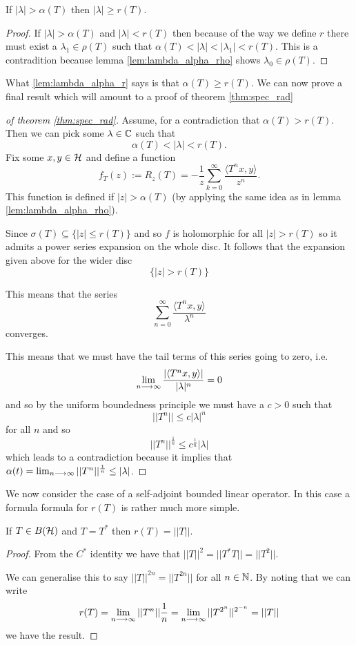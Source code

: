 \documentclass{unswmaths}
\begin{document}
\begin{lemma}
	\label{lem:lambda_alpha_r}
	If $ |\lambda| > \alpha(T) $ then $ |\lambda| \geq r(T) $.
\end{lemma}
\begin{proof}
	If $ |\lambda| > \alpha(T) $ and $ |\lambda| < r(T) $ then because of the way we define $ r $ there must exist a $ \lambda_1 \in \rho(T) $ such that
	$ \alpha(T) < |\lambda| < |\lambda_1| < r(T) $. This is a contradition because lemma \ref{lem:lambda_alpha_rho} shows
	$ \lambda_0 \in \rho(T) $.
\end{proof}

What \ref{lem:lambda_alpha_r} says is that $ \alpha(T) \geq r(T) $.
We can now prove a final result which will amount to a proof of theorem \ref{thm:spec_rad}

\begin{proof}[of theorem \ref{thm:spec_rad}]
Assume, for a contradiction that $ \alpha(T) > r(T) $. Then we can pick some $ \lambda \in \mathbb{C} $ such that 
$$
	\alpha(T) < |\lambda| < r(T).
$$
Fix some $ x, y \in \mathcal{H} $ and define a function
$$
	f_T(z) := R_z(T) = -\frac{1}{z} \sum_{k=0}^\infty \frac{\langle T^n x, y \rangle}{z^n}.
$$
This function is defined if $ |z| > \alpha(T) $ (by applying the same idea as in lemma \ref{lem:lambda_alpha_rho}).

Since $ \sigma(T) \subseteq \{ |z| \leq r(T) \} $ and so $ f $ is holomorphic for all $ |z| > r(T) $ so
it admits a power series expansion on the whole disc. It follows that the expansion given above for the wider disc
$$ \{ |z| > r(T) \} $$

This means that the series 
$$
	\sum_{n=0}^\infty \frac{\langle T^n x, y \rangle}{\lambda^n}
$$
converges.

This means that we must have the tail terms of this series going to zero, i.e.
$$
	\lim_{n \longrightarrow \infty} \frac{|\langle T^n x, y \rangle|}{|\lambda|^n} = 0
$$
and so by the uniform boundedness principle we must have a $ c > 0 $ such that
$$
	||T^n|| \leq c|\lambda|^n
$$
for all $ n $ and so
$$
	||T^n||^\frac{1}{n} \leq c^\frac{1}{n} |\lambda|
$$
which leads to a contradiction because it implies that $ \alpha(t) = \lim_{n \longrightarrow \infty} ||T^n||^\frac{1}{n} \leq |\lambda| $.
\end{proof}

We now consider the case of a self-adjoint bounded linear operator. In this case a formula formula for $ r(T) $
is rather much more simple.
\begin{lemma}
	If $ T \in B(\mathcal{H}) $ and $ T = T^* $ then $ r(T) = ||T|| $.
\end{lemma}
\begin{proof}
	From the $C^*$ identity we have that $ ||T||^2 = ||T^*T|| = ||T^2|| $.
	
	We can generalise this to say $ ||T||^{2n} = ||T^{2n}|| $ for all $ n \in \mathbb{N} $.
	By noting that we can write
	$$
		r(T) = \lim_{n \longrightarrow \infty} ||T^n||\frac{1}{n} = \lim_{n \longrightarrow \infty}||T^{2^n}||^{2^{-n}} = ||T||
	$$
	we have the result.
\end{proof}
\end{document}
